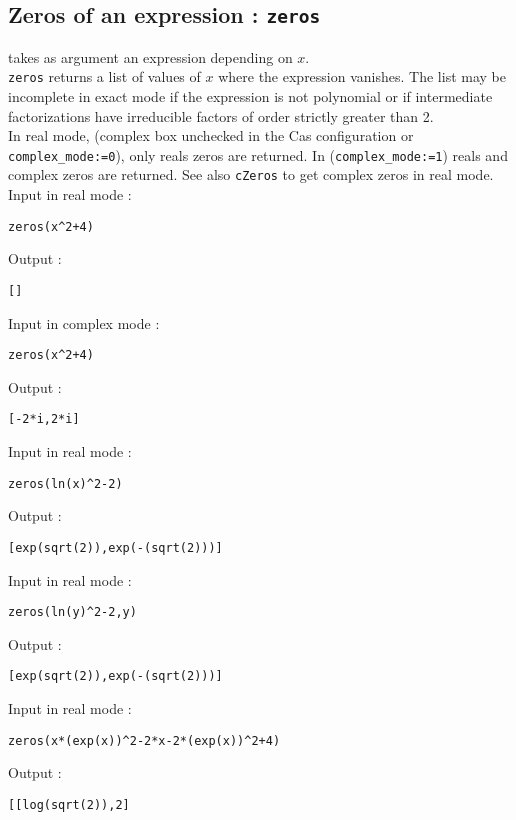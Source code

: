 \documentclass[a4paper,11pt]{book}
\begin{document}
\subsection{Zeros of an expression : {\tt zeros}}
 takes as argument an expression depending on $x$.\\
{\tt zeros} returns a list of values of $x$ where the expression
vanishes. The list may be incomplete in exact mode if the expression
is not polynomial or if intermediate
factorizations have irreducible factors of order strictly
greater than 2.\\
In real mode, (complex box unchecked in the Cas configuration
or {\tt complex\_mode:=0}), only reals zeros are returned. In
({\tt complex\_mode:=1}) reals and complex zeros are returned. See
also {\tt cZeros} to get complex zeros in real mode.\\
Input in real mode : 
\begin{center}{\tt zeros(x\verb|^|2+4)}\end{center} 
Output :
\begin{center}{\tt []}\end{center} 
Input in complex mode : 
\begin{center}{\tt zeros(x\verb|^|2+4)}\end{center} 
Output :
\begin{center}{\tt [-2*i,2*i]}\end{center} 
Input in real mode : 
\begin{center}{\tt zeros(ln(x)\verb|^|2-2)}\end{center} 
Output :
\begin{center}{\tt [exp(sqrt(2)),exp(-(sqrt(2)))]}\end{center} 
Input in real mode : 
\begin{center}{\tt zeros(ln(y)\verb|^|2-2,y)}\end{center} 
Output :
\begin{center}{\tt [exp(sqrt(2)),exp(-(sqrt(2)))]}\end{center} 
Input in real mode : 
\begin{center}{\tt zeros(x*(exp(x))\verb|^|2-2*x-2*(exp(x))\verb|^|2+4)}\end{center} 
Output :
 \begin{center}{\tt [[log(sqrt(2)),2]}\end{center} 
\end{document}
